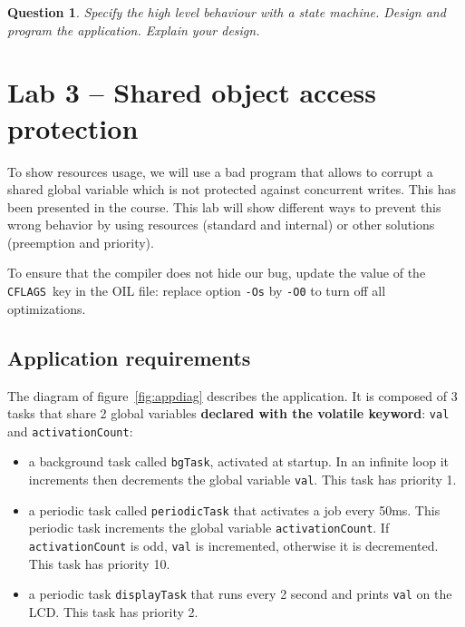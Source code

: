 \documentclass[11pt]{report}
\newtheorem{ex}{Question}
\begin{document}
\begin{ex}
    Specify the high level behaviour with a state machine.
    Design and program the application.
    Explain your design.
\end{ex}

\chapter{Lab 3 -- Shared object access protection}

To show resources usage, we will use a bad program that allows to corrupt a shared global variable which is not protected against concurrent writes. This has been presented in the course. This lab will show different ways to prevent this wrong behavior by using resources (standard and internal) or other solutions (preemption and priority).

To ensure that the compiler does not hide our bug, update the value of the \texttt{CFLAGS} key in the OIL file: replace option \texttt{-Os} by \texttt{-O0} to turn off all optimizations.

\section{Application requirements}

The diagram of figure~\ref{fig:appdiag} describes the application.
It is composed of 3 tasks that share 2 global variables {\bf declared with the volatile keyword}: \texttt{val} and \texttt{activationCount}:
\begin{itemize}
\item a background task called \texttt{bgTask}, activated at startup. In an infinite loop it increments then decrements the global variable \texttt{val}. This task has priority 1.
\item a periodic task called \texttt{periodicTask} that activates a job every 50ms. This periodic task increments the global variable \texttt{activationCount}. If \texttt{activationCount} is odd, \texttt{val} is incremented, otherwise it is decremented. This task has priority 10.
\item a periodic task \texttt{displayTask} that runs every 2 second and prints \texttt{val} on the LCD. This task has priority 2.
\end{itemize}

\def\alarm#1#2{
  \node[alarm](#1) [#2] {};
  \coordinate (a) at ($(#1.north)$);
  \coordinate (b) at ($(#1.north east)$);
  \coordinate (c) at ($(#1.north west)$);
  \coordinate (d) at ($(#1)$);
  \draw[thick] ($(a)+(-0.1,0)$) rectangle ($(a)+(0.1,0.1)$);
  \draw[rotate=-45,thick] ($(b)+(-0.05,0)$) rectangle ($(b)+(0.05,0.1)$);
  \draw[rotate=45,thick] ($(c)+(-0.05,0)$) rectangle ($(c)+(0.05,0.1)$);
  \draw ($(d)+(0.3,0)$) -- (d) -- ($(d)+(0,0.3)$);
  \node [font=\scriptsize,below=0.5mm of #1] {{\em Alarm}}
}
\end{document}
